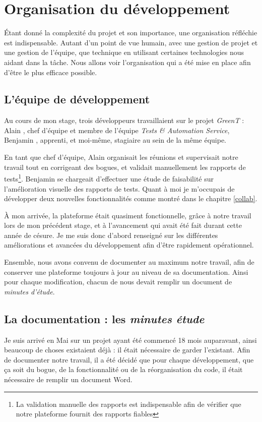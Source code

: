 \chapter{Organisation du développement}\label{chapOrganization}
\putminitoc \'Etant donné la complexité du projet et son importance, une organisation réfléchie est indispensable. Autant d'un point de vue humain, avec une gestion de projet et une gestion de l'équipe, que technique en utilisant certaines technologies nous aidant dans la tâche.  Nous allons voir l'organisation qui a été mise en place afin d'être le plus efficace possible.

\vspace{-25px}
\section{L'équipe de développement}
Au cours de mon stage, trois développeurs travaillaient sur le projet \textit{GreenT} : Alain , chef d’équipe et membre de
l’équipe \textit{Tests \& Automation Service}, Benjamin , apprenti, et moi-même, stagiaire au sein de la même équipe.

En tant que chef d’équipe, Alain  organisait les réunions et supervisait notre travail tout en corrigeant des bogues, et validait manuellement les rapports de tests\footnote{La validation manuelle des rapports est indispensable afin de vérifier que notre plateforme fournit des rapports fiables}. Benjamin  se chargeait d'effectuer une étude de faisabilité sur l'amélioration visuelle des rapports de tests. Quant à moi je m'occupais de développer deux nouvelles fonctionnalités comme montré dans le chapitre \ref{collab}.


À mon arrivée, la plateforme était quasiment fonctionnelle, grâce à notre travail lors de mon précédent stage, et à l'avancement qui avait été fait durant cette année de césure. Je me suis donc d'abord renseigné sur les différentes améliorations et avancées du développement afin d'être rapidement opérationnel.  

Ensemble, nous avons convenu de documenter au maximum notre travail, afin de conserver une plateforme toujours à jour au niveau de sa documentation. Ainsi pour chaque modification, chacun de nous devait remplir un document de \textit{minutes d'étude}.

\section{La documentation : les \textit{minutes étude}}
Je suis arrivé en Mai sur un projet ayant été commencé 18 mois auparavant, ainsi beaucoup de choses existaient déjà : il était nécessaire de
garder l'existant. Afin de documenter notre travail, il a été décidé que pour chaque développement, que ça soit du bogue, de la fonctionnalité ou de la réorganisation du code, il était nécessaire de remplir un document Word.

